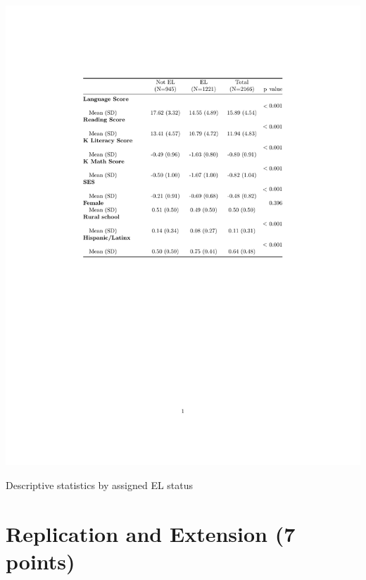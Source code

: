 \documentclass[a4paper, 11pt]{article}
\begin{document}
\begin{enumerate}
\begin{table}
\includegraphics{tables/descriptives.pdf}
	\caption{Descriptive statistics by assigned EL status \label{tab:descriptives}}
\end{table}

\end{enumerate}
\pagebreak

\section{Replication and Extension (7 points)}
\end{document}
